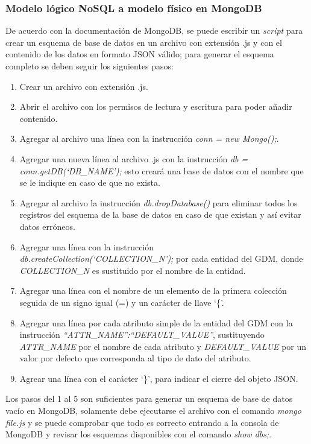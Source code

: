 \subsubsection{Modelo lógico NoSQL a modelo físico en MongoDB}\label{sec:logico-documentos-fisico}


De acuerdo con la documentación de MongoDB\cite{mongodb_mongodb_2020}, se puede escribir un \textit{script} para crear un esquema  de base de datos en un archivo con extensión .js y con el contenido de los datos en formato JSON válido; para generar el esquema completo se deben seguir los siguientes pasos:


\begin{enumerate}
    \item Crear un archivo con extensión .js.
    \item Abrir el archivo con los permisos de lectura y escritura para poder añadir contenido.
    \item Agregar al archivo una línea con la instrucción \textit{conn = new Mongo();}.
    \item Agregar una nueva línea al archivo .js con la instrucción \textit{db = conn.getDB(`DB\_NAME');} esto creará una base de datos con el nombre que se le indique en caso de que no exista.
    \item Agregar al archivo la instrucción \textit{db.dropDatabase()} para eliminar todos los registros del esquema de la base de datos en caso de que existan y así evitar datos erróneos.
    \item Agregar una línea con la instrucción \textit{db.createCollection(`COLLECTION\_N');} por cada entidad del GDM, donde \textit{COLLECTION\_N} es sustituido por el nombre de la entidad.
    \item Agregar una línea con el nombre de un elemento de la primera colección seguida de un signo igual (=) y un carácter de llave `\{'.
    \item Agregar una línea por cada atributo simple de la entidad del GDM con la instrucción \textit{``ATTR\_NAME'':``DEFAULT\_VALUE''}, sustituyendo \textit{ATTR\_NAME} por el nombre de cada atributo y \textit{DEFAULT\_VALUE} por un valor por defecto que corresponda al tipo de dato del atributo.
    \item Agrear una línea con el carácter `\}', para indicar el cierre del objeto JSON.
\end{enumerate}


Los pasos del 1 al 5 son suficientes para generar un esquema de base de datos vacío en MongoDB, solamente debe ejecutarse el archivo con el comando \textit{mongo file.js} y se puede comprobar que todo es correcto entrando a la consola de MongoDB y revisar los esquemas disponibles con el comando \textit{show dbs;}.


